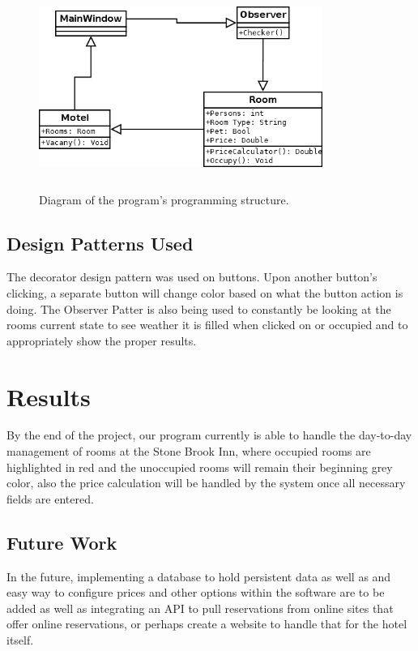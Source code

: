 \documentclass[10pt,conference,onecolumn,compsoc]{IEEEtran}
\begin{document}
\begin{figure}[ht!]
\includegraphics[height=250px, width=350px]{uml.png}
\caption{Diagram of the program's programming structure.}
\label{UML}
\end{figure}



\subsection{Design Patterns Used}
The decorator design pattern was used on buttons. Upon another button's clicking, a separate button will change color based on what the button action is doing.
The Observer Patter is also being used to constantly be looking at the rooms current state to see weather it is filled when clicked on or occupied and to appropriately show the proper results.


\section{Results}
By the end of the project, our program currently is able to handle the day-to-day management of rooms at the Stone Brook Inn, where occupied rooms are highlighted in red and the unoccupied rooms will remain their beginning grey color, also the price calculation will be handled by the system once all necessary fields are entered. 

\subsection{Future Work}
In the future, implementing a database to hold persistent data as well as and easy way to configure prices and other options within the software are to be added as well as integrating an API to pull reservations from online sites that offer online reservations, or perhaps create a website to handle that for the hotel itself. 
\end{document}
